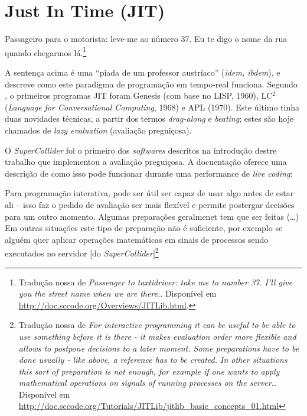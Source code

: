 \section{Just In Time (JIT)}\label{sec:jit}

\begin{citacao}
Passageiro para o motorista: leve-me ao número 37. Eu te digo o nome da rua quando chegarmos lá.\footnote{Tradução nossa de \emph{Passenger to taxtidriver: take me to number 37. I'll give you the street name when we are there.}. Disponível em \url{http://doc.sccode.org/Overviews/JITLib.html}.}
\end{citacao}

A sentença acima é uma ``piada de um professor austríaco'' (\emph{idem, ibdem}), e descreve como este paradigma de programação em tempo-real funciona. Segundo , o primeiros programas JIT foram Genesis (com base no LISP, 1960), LC$^2$ (\emph{Language for Conversational Computing}, 1968) e APL (1970). Este último tinha duas novidades técnicas, a partir dos termos \emph{drag-along} e \emph{beating}; estes são hoje chamados de \emph{lazy evaluation} (avaliação preguiçosa). 

O \emph{SuperCollider} foi o primeiro dos \emph{softwares} descritos na introdução destre trabalho que implementou a avaliação preguiçosa.
A docuentação oferece uma descrição de como isso pode funcionar durante uma performance de \emph{live coding}:

\begin{citacao}
Para programação interativa, pode ser útil ser capaz de usar algo antes de estar ali -- isso faz o pedido de avaliação ser mais flexível e permite postergar decisões para um outro momento. Algumas preparações geralmenet tem que ser feitas (\ldots) Em outras situações este tipo de preparação não é suficiente, por exemplo se alguém quer aplicar operações matemáticas em sinais de processos sendo executados no servidor $[$do \emph{SuperCollider}$]$\footnote{Tradução nossa de \emph{For interactive programming it can be useful to be able to use something before it is there - it makes evaluation order more flexible and allows to postpone decisions to a later moment. Some preparations have to be done usually - like above, a reference has to be created. In other situations this sort of preparation is not enough, for example if one wants to apply mathematical operations on signals of running processes on the server.}. Disponível em \url{http://doc.sccode.org/Tutorials/JITLib/jitlib_basic_concepts_01.html}}
\end{citacao}

